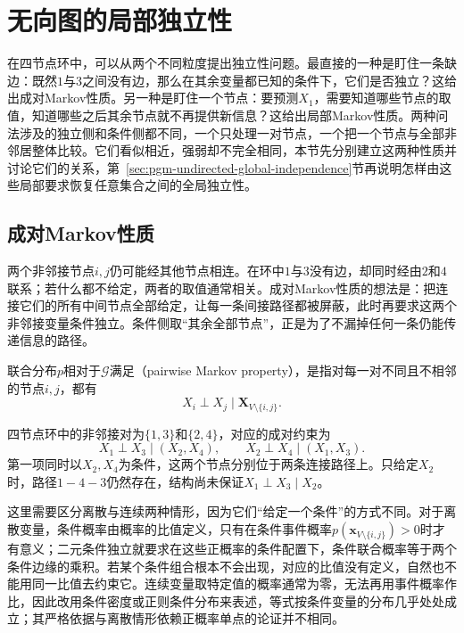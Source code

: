 \section{无向图的局部独立性}
\label{sec:pgm-undirected-local-independence}

在四节点环中，可以从两个不同粒度提出独立性问题。最直接的一种是盯住一条缺边：既然$1$与$3$之间没有边，那么在其余变量都已知的条件下，它们是否独立？这给出成对Markov性质。另一种是盯住一个节点：要预测$X_1$，需要知道哪些节点的取值，知道哪些之后其余节点就不再提供新信息？这给出局部Markov性质。两种问法涉及的独立侧和条件侧都不同，一个只处理一对节点，一个把一个节点与全部非邻居整体比较。它们看似相近，强弱却不完全相同，本节先分别建立这两种性质并讨论它们的关系，第~\ref{sec:pgm-undirected-global-independence}节再说明怎样由这些局部要求恢复任意集合之间的全局独立性。

\subsection{成对Markov性质}
\label{sec:pgm-undirected-pairwise}

两个非邻接节点$i,j$仍可能经其他节点相连。在环中$1$与$3$没有边，却同时经由$2$和$4$联系；若什么都不给定，两者的取值通常相关。成对Markov性质的想法是：把连接它们的所有中间节点全部给定，让每一条间接路径都被屏蔽，此时再要求这两个非邻接变量条件独立。条件侧取“其余全部节点”，正是为了不漏掉任何一条仍能传递信息的路径。

\begin{definition}[成对Markov性质]
  \label{def:pgm-undirected-pairwise}
  联合分布$p$相对于$\mathcal{G}$满足（pairwise Markov property），是指对每一对不同且不相邻的节点$i,j$，都有
  \begin{equation}
    X_i\perp X_j\mid\bm{X}_{V\setminus\{i,j\}}.
    \label{eq:pgm-undirected-pairwise}
  \end{equation}
\end{definition}

四节点环中的非邻接对为$\{1,3\}$和$\{2,4\}$，对应的成对约束为
\[
  X_1\perp X_3\mid(X_2,X_4),
  \qquad
  X_2\perp X_4\mid(X_1,X_3).
\]
第一项同时以$X_2,X_4$为条件，这两个节点分别位于两条连接路径上。只给定$X_2$时，路径$1-4-3$仍然存在，结构尚未保证$X_1\perp X_3\mid X_2$。

这里需要区分离散与连续两种情形，因为它们“给定一个条件”的方式不同。对于离散变量，条件概率由概率的比值定义，只有在条件事件概率$p(\bm{x}_{V\setminus\{i,j\}})>0$时才有意义；二元条件独立就要求在这些正概率的条件配置下，条件联合概率等于两个条件边缘的乘积。若某个条件组合根本不会出现，对应的比值没有定义，自然也不能用同一比值去约束它。连续变量取特定值的概率通常为零，无法再用事件概率作比，因此改用条件密度或正则条件分布来表述，等式按条件变量的分布几乎处处成立；其严格依据与离散情形依赖正概率单点的论证并不相同。

